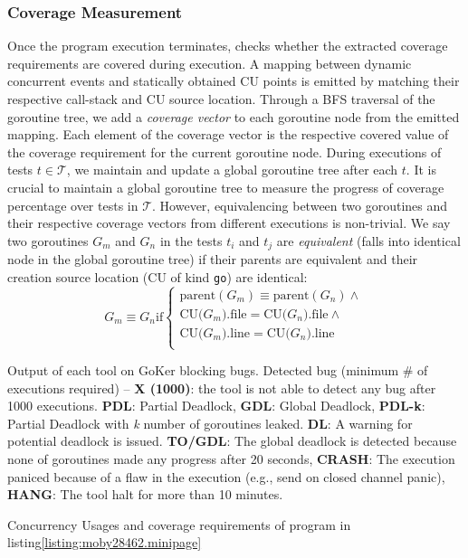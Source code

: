 \subsubsection{Coverage Measurement}
Once the program execution terminates, \goat checks whether the extracted coverage requirements are covered during execution.
%
A mapping between dynamic concurrent events and statically obtained CU points is emitted by matching their respective call-stack and CU source location.
%
Through a BFS traversal of the goroutine tree, we add a \textit{coverage vector} to each goroutine node from the emitted mapping.
%
Each element of the coverage vector is the respective covered value of the coverage requirement for the current goroutine node.
%
During executions of tests $t \in \mathcal{T}$, we maintain and update a global goroutine tree after each $t$.
%
It is crucial to maintain a global goroutine tree to measure the progress of coverage percentage over tests in $\mathcal{T}$.
%
However, equivalencing between two goroutines and their respective coverage vectors from different executions is non-trivial.
%
We say two goroutines $G_m$ and $G_n$ in the tests $t_i$ and $t_j$ are \textit{equivalent} (\ie falls into identical node in the global goroutine tree) if their parents are equivalent and their creation source location (CU of kind \texttt{go}) are identical:
\begin{equation}
  G_m \equiv G_n   \text{if}
  \begin{cases}
    \text{parent}(G_m) \equiv \text{parent}(G_n)  \wedge \\
    \text{CU(}G_m\text{).file} = \text{CU(}G_n\text{).file}  \wedge\\
    \text{CU(}G_m\text{).line} = \text{CU(}G_n\text{).line} \\
  \end{cases}
\end{equation}


\begin{table}[]
\caption{Output of each tool on GoKer \cite{yuan-gobench-cgo21} blocking bugs. Detected bug (minimum \# of executions required) -- \textbf{X (1000)}: the tool is not able to detect any bug after 1000 executions. \textbf{PDL}: Partial Deadlock, \textbf{GDL}: Global Deadlock, \textbf{PDL-k}: Partial Deadlock with \textit{k} number of goroutines leaked. \textbf{DL}: A warning for potential deadlock is issued. \textbf{TO/GDL}: The global deadlock is detected because none of goroutines made any progress after 20 seconds, \textbf{CRASH}: The execution paniced because of a flaw in the execution (e.g., send on closed channel panic), \textbf{HANG}: The tool halt for more than 10 minutes.}
\centering
\scalebox{0.72}{
    
  }
\label{tab:comparison}
\end{table}






\begin{table}[]
\centering
\caption{Concurrency Usages and coverage requirements of program in listing\ref{listing:moby28462.minipage}}
\scalebox{0.9}{

}
\label{tab:moby_cov_table}
\end{table}
